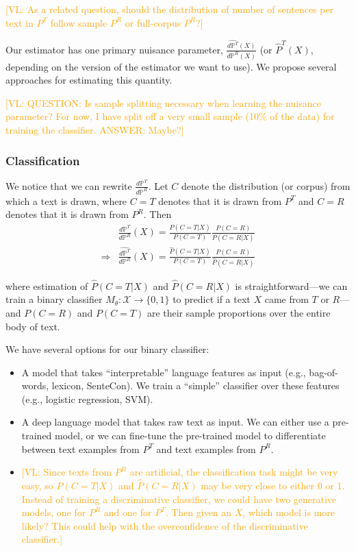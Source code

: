\documentclass{article}
\newcommand{\vl}[1]{\textcolor{orange}{[VL: #1]}}
\begin{document}
\vl{As a related question, should the distribution of number of sentences per text in $P^T$ follow sample $P^R$ or full-corpus $P^R$?}

Our estimator has one primary nuisance parameter, $\frac{\hat{d\mathbb{P}^T}(X)}{d\mathbb{P}^R(X)}$ (or $\hat{P}^T(X)$, depending on the version of the estimator we want to use). We propose several approaches for estimating this quantity.

\vl{QUESTION: Is sample splitting necessary when learning the nuisance parameter? For now, I have split off a very small sample (10\% of the data) for training the classifier.
ANSWER: Maybe?}

\subsubsection{Classification}
\label{sec:classification}

We notice that we can rewrite $\frac{d\mathbb{P}^T}{d\mathbb{P}^R}$. Let $C$ denote the distribution (or corpus) from which a text is drawn, where $C=T$ denotes that it is drawn from $P^T$ and $C=R$ denotes that it is drawn from $P^R$. Then
\begin{equation*}
    \begin{split}
        &\frac{d\mathbb{P}^T}{d\mathbb{P}^R}(X) = \frac{P(C=T|X)}{P(C=T)}\frac{P(C=R)}{P(C=R|X)}\\
        \Rightarrow &\frac{\hat{d\mathbb{P}^T}}{d\mathbb{P}^R}(X) = \frac{\hat{P}(C=T|X)}{P(C=T)}\frac{P(C=R)}{\hat{P}(C=R|X)}
    \end{split}
\end{equation*}

where estimation of $\hat{P}(C=T|X)$ and $\hat{P}(C=R|X)$ is straightforward---we can train a binary classifier $M_\theta: \mathcal{X} \rightarrow \{0,1\}$ to predict if a text $X$ came from $T$ or $R$---and $P(C=R)$ and $P(C=T)$ are their sample proportions over the entire body of text.

We have several options for our binary classifier:
\begin{itemize}
    \item A model that takes ``interpretable'' language features as input (e.g., bag-of-words, lexicon, SenteCon). We train a ``simple'' classifier over these features (e.g., logistic regression, SVM).
    \item A deep language model that takes raw text as input. We can either use a pre-trained model, or we can fine-tune the pre-trained model to differentiate between text examples from $P^T$ and text examples from $P^R$.
    \item \vl{Since texts from $P^R$ are artificial, the classification task might be very easy, so $\hat{P}(C=T|X)$ and $\hat{P}(C=R|X)$ may be very close to either 0 or 1. Instead of training a discriminative classifier, we could have two generative models, one for $P^R$ and one for $P^T$. Then given an $X$, which model is more likely? This could help with the overconfidence of the discriminative classifier.}
\end{itemize}
\end{document}
